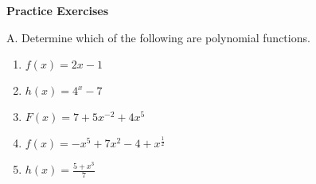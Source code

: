 \textbf{Practice Exercises}

\vspce

A. Determine which of the following are polynomial functions. 


\begin{enumerate}[label = \arabic*. ]

\item \hspce \hspce $f(x) = 2x-1$
\vspce
\item \hspce \hspce $h(x) =4^x-7$
\vspce
\item \hspce \hspce $F(x) =7+5x^{-2}+4x^5$
\vspce
\item \hspce \hspce $f(x) =-x^5+7x^2-4+x^{\frac{1}{2} }$
\vspce
\item \hspce \hspce $h(x) = \displaystyle \frac{5+x^3}{7} $


\end{enumerate}




